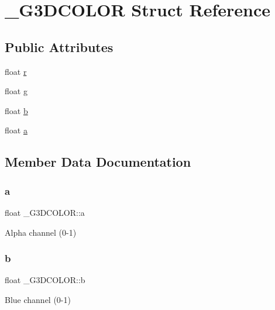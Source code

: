 \hypertarget{struct__G3DCOLOR}{}\section{\+\_\+\+G3\+D\+C\+O\+L\+OR Struct Reference}
\label{struct__G3DCOLOR}
\subsection*{Public Attributes}
\begin{DoxyCompactItemize}
\item 
float \hyperlink{struct__G3DCOLOR_a5d4de59d19a31c17b892f15478ff3a34}{r}
\item 
float \hyperlink{struct__G3DCOLOR_a7217a9ae029b46909502cc44d404a3a2}{g}
\item 
float \hyperlink{struct__G3DCOLOR_ae658e14b2fc92f31bb490f8df414106d}{b}
\item 
float \hyperlink{struct__G3DCOLOR_a59eda935f734372661eee4aadc6f31f6}{a}
\end{DoxyCompactItemize}


\subsection{Member Data Documentation}
\mbox{\label{struct__G3DCOLOR_a59eda935f734372661eee4aadc6f31f6}} 
\subsubsection{\texorpdfstring{a}{a}}
{\footnotesize\ttfamily float \+\_\+\+G3\+D\+C\+O\+L\+O\+R\+::a}

Alpha channel (0-\/1) \mbox{\label{struct__G3DCOLOR_ae658e14b2fc92f31bb490f8df414106d}} 
\subsubsection{\texorpdfstring{b}{b}}
{\footnotesize\ttfamily float \+\_\+\+G3\+D\+C\+O\+L\+O\+R\+::b}

Blue channel (0-\/1) \mbox{\label{struct__G3DCOLOR_a7217a9ae029b46909502cc44d404a3a2}} 
